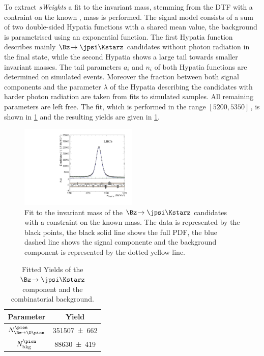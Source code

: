 To extract \emph{sWeights} a fit to the invariant \Bz mass, stemming from the DTF with a contraint on the known \jpsi, mass is performed.
The signal model consists of a sum of two double-sided Hypatia functions with a shared mean value, the background is parametrised using an exponential function.
The first Hypatia function describes mainly $\Bz\!\to\jpsi\Kstarz$ candidates without photon radiation in the final state, while the second Hypatia shows a large tail towards smaller invariant masses.
The tail parameters $a_i$ and $n_i$ of both Hypatia functions are determined on simulated events.
Moreover the fraction between both signal components and the parameter $\lambda$ of the Hypatia describing the \Bz candidates with harder photon radiation are taken from fits to simulated samples.
All remaining parameters are left free.
The fit, which is performed in the range $[5200, 5350]\,$\si[per-mode=symbol]{\MeVcc}, is shown in \cref{fig:massFitJpsiKst} and the resulting yields are given in \cref{tab:yieldsJpsiKst}.
\begin{figure}[tbp]
    \centering
    \includegraphics[width=0.5\textwidth]{08FlavourTagging/figs/BmassJpsiKst_pull.pdf}
    \caption{Fit to the invariant mass of the $\Bz\!\to\jpsi\Kstarz$ candidates with a constraint on the known \jpsi mass.
    The data is represented by the black points, the black solid line shows the full PDF, the blue dashed line shows the signal componente and the background component is represented by the dotted yellow line.}
    \label{fig:massFitJpsiKst}
\end{figure}
\begin{table}[tbp]
	\centering
	\caption{Fitted Yields of the $\Bz\!\to\jpsi\Kstarz$ component and the combinatorial background.}
	\begin{tabular}{cc}
		\toprule
		Parameter & Yield \\
		\midrule
		$N_{\Bz\!\to\D\pion}^{\pion}$	& \num{351507\pm662} \\
		$N_{\text{bkg}}^{\pion}$		& \num{88630\pm419} \\
		\bottomrule
	\end{tabular}
	\label{tab:yieldsJpsiKst}
\end{table}

